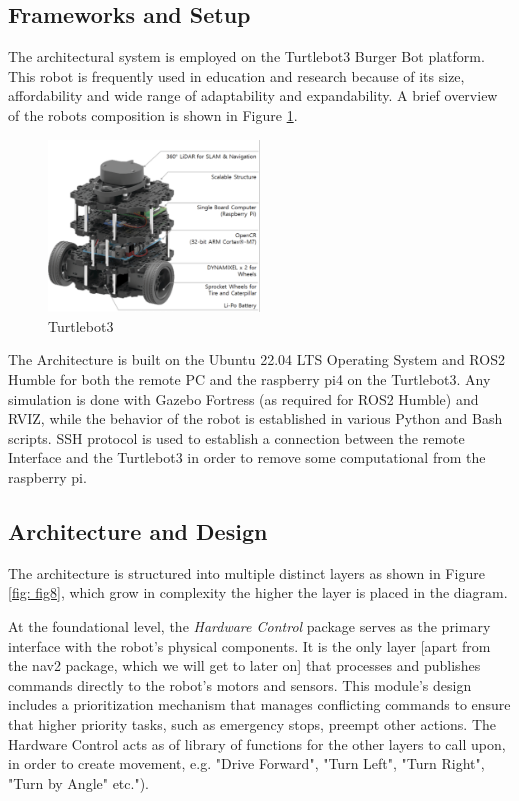 \documentclass[]{article}
\begin{document}
	\subsection{Frameworks and Setup}

	The architectural system is employed on the Turtlebot3 Burger Bot platform. This robot is frequently used in education and research because of its size, affordability and wide range of adaptability and expandability. A brief overview of the robots composition is shown in Figure \ref{fig: fig7}. 
		
	\begin{figure}[ht]
		\centering
		\includegraphics[width=0.5\textwidth]{Graphics/Turtlebot3}
		\caption{Turtlebot3}
		\label{fig: fig7}
	\end{figure}
		
	 The Architecture is built on the Ubuntu 22.04 LTS Operating System and ROS2 Humble for both the remote PC and the raspberry pi4 on the Turtlebot3. Any simulation is done with Gazebo Fortress (as required for ROS2 Humble) and RVIZ, while the behavior of the robot is established in various Python and Bash scripts. SSH protocol is used to establish a connection between the remote Interface and the Turtlebot3 in order to remove some computational from the raspberry pi. 
	 
	 \newpage
	\subsection{Architecture and Design}
	
	The architecture is structured into multiple distinct layers as shown in Figure \ref{fig: fig8}, which grow in complexity the higher the layer is placed in the diagram.
	
	At the foundational level, the \textit{Hardware Control} package serves as the primary interface with the robot's physical components. It is the only layer [apart from the nav2 package, which we will get to later on] that processes and publishes commands directly to the robot's motors and sensors. This module's design includes a prioritization mechanism that manages conflicting commands to ensure that higher priority tasks, such as emergency stops, preempt other actions. The Hardware Control acts as of library of functions for the other layers to call upon, in order to create movement, e.g. "Drive Forward", "Turn Left", "Turn Right", "Turn by Angle" etc.").
	
\end{document}
